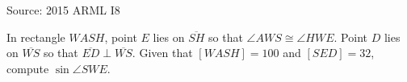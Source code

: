 Source: 2015 ARML I8



In rectangle $WASH$, point $E$ lies on $\overline{SH}$ so that $\angle AWS \cong \angle HWE$. Point $D$ lies on $\overline{WS}$ so that $\overline{ED} \perp \overline{WS}$. Given that $[WASH]=100$ and $[SED] = 32$, compute $\sin \angle SWE$.

